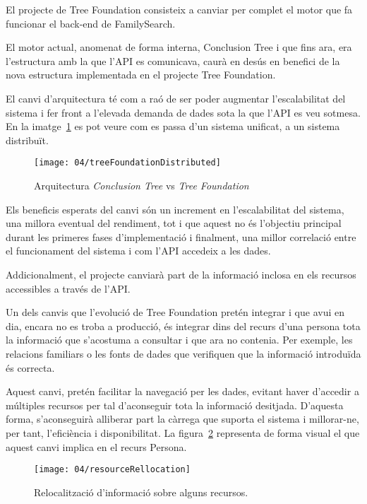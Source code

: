     El projecte de Tree Foundation consisteix a canviar per complet el motor que fa funcionar el back-end de FamilySearch.

    El motor actual, anomenat de forma interna, Conclusion Tree i que fins ara, era l’estructura amb la que l'API es comunicava, caurà en desús en benefici de la nova estructura implementada en el projecte Tree Foundation.

    El canvi d’arquitectura té com a raó de ser poder augmentar l’escalabilitat del sistema i fer front a l'elevada demanda de dades sota la que l'API es veu sotmesa. En la imatge~\ref{fig:architecture} es pot veure com es passa d’un sistema unificat, a un sistema distribuït.

    \begin{figure}[h]
        \texttt{[image: 04/treeFoundationDistributed]}
        \centering
        \caption{Arquitectura \emph{Conclusion Tree} vs \emph{Tree Foundation}\label{fig:architecture}}
    \end{figure}

    Els beneficis esperats del canvi són un increment en l'escalabilitat del sistema, una millora eventual del rendiment, tot i que aquest no és l’objectiu principal durant les primeres fases d’implementació i finalment, una millor correlació entre el funcionament del sistema i com l'API accedeix a les dades.

    Addicionalment, el projecte canviarà part de la informació inclosa en els recursos accessibles a través de l'API.

    Un dels canvis que l’evolució de Tree Foundation pretén integrar i que avui en dia, encara no es troba a producció, és integrar dins del recurs d’una persona tota la informació que s’acostuma a consultar i que ara no contenia. Per exemple, les relacions familiars o les fonts de dades que verifiquen que la informació introduïda és correcta.

    Aquest canvi, pretén facilitar la navegació per les dades, evitant haver d’accedir a múltiples recursos per tal d’aconseguir tota la informació desitjada. D'aquesta forma, s'aconseguirà alliberar part la càrrega que suporta el sistema i millorar-ne, per tant, l'eficiència i disponibilitat. La figura~\ref{ref:resources} representa de forma visual el que aquest canvi implica en el recurs Persona.

    \begin{figure}[h]
        \texttt{[image: 04/resourceRellocation]}
        \centering
        \caption{Relocalització d'informació sobre alguns recursos.\label{ref:resources}}
    \end{figure}

